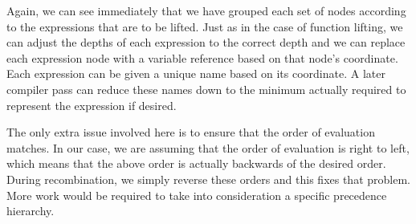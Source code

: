 \documentclass[pldi]{sigplanconf-pldi15}
\begin{document}
Again, we can see immediately that we have grouped each set of nodes according to the expressions 
that are to be lifted. Just as in the case of function lifting, we can adjust the depths of each 
expression to the correct depth and we can replace each expression node with a variable reference
 based on that node’s coordinate. Each expression can be given a unique name based on its 
 coordinate. A later compiler pass can reduce these names down to the minimum actually required to 
 represent the expression if desired. 

The only extra issue involved here is to ensure that the order of evaluation matches. In our case, we 
are assuming that the order of evaluation is right to left, which means that the above order is actually 
backwards of the desired order. During recombination, we simply reverse these orders and this fixes 
that problem. More work would be required to take into consideration a specific precedence hierarchy. 
\end{document}
